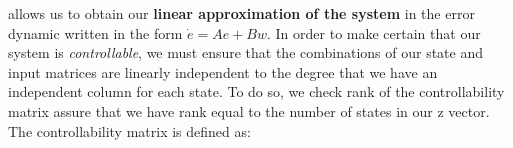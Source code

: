 \documentclass{article}
\begin{document}
\begin{multicols}{2}
allows us to obtain our \textbf{linear approximation of the system}  in the error dynamic written in the form $ \dot{e}=Ae+Bw$.
In order to make certain that our system is \emph{controllable}, we must ensure that the combinations of our state and input matrices are linearly independent to the degree that we have an independent column for each state.  To do so, we check rank of the controllability matrix assure that we have rank equal to the number of states in our z vector.  The controllability matrix is defined as:


\end{multicols}
\end{document}
